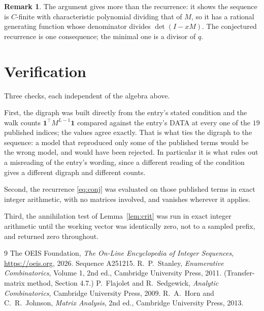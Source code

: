 \documentclass[11pt,a4paper]{article}
\theoremstyle{plain}
\theoremstyle{definition}
\newtheorem{remark}[theorem]{Remark}
\begin{document}
\begin{remark}
The argument gives more than the recurrence: it shows the sequence is $C$-finite with
characteristic polynomial dividing that of $M$, so it has a rational generating function
whose denominator divides $\det(I-xM)$. The conjectured recurrence is one consequence; the
minimal one is a divisor of $q$.
\end{remark}

\section{Verification}

Three checks, each independent of the algebra above.

First, the digraph was built directly from the entry's stated condition and the walk counts
$\mathbf{1}^{\!\top}M^{L-1}\mathbf{1}$ compared against the entry's DATA at
every one of the $19$ published indices; the values agree exactly. That is what ties
the digraph to the sequence: a model that reproduced only some of the published terms would
be the wrong model, and would have been rejected. In particular it is what rules out a
misreading of the entry's wording, since a different reading of the condition gives a
different digraph and different counts.

Second, the recurrence \eqref{eq:conj} was evaluated on those published terms in exact
integer arithmetic, with no matrices involved, and vanishes wherever it applies.

Third, the annihilation test of Lemma~\ref{lem:crit} was run in exact integer arithmetic
until the working vector was identically zero, not to a sampled prefix, and returned zero
throughout.

\begin{thebibliography}{9}
 The OEIS Foundation, \emph{The On-Line Encyclopedia of Integer
Sequences}, \url{https://oeis.org}, 2026. Sequence A251215.
 R.~P.~Stanley, \emph{Enumerative Combinatorics}, Volume 1, 2nd ed.,
Cambridge University Press, 2011. (Transfer-matrix method, Section 4.7.)
 P.~Flajolet and R.~Sedgewick, \emph{Analytic Combinatorics}, Cambridge
University Press, 2009.
 R.~A.~Horn and C.~R.~Johnson, \emph{Matrix Analysis}, 2nd ed., Cambridge
University Press, 2013.
\end{thebibliography}
\end{document}
